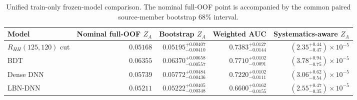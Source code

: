 \begin{table}[tb]
  \centering
  \footnotesize
  \caption{Unified train-only frozen-model comparison. The nominal full-OOF point is accompanied by the common paired source-member bootstrap 68\% interval.}
  \label{tab:baseline-metrics}
  \begin{tabular}{lrrrr}
    \toprule
    Model & Nominal full-OOF $Z_A$ & Bootstrap $Z_A$ & Weighted AUC & Systematics-aware $Z_A$ \\
    \midrule
    $R_{HH}(125,120)$ cut & $0.05168$ & $0.05195^{+0.00407}_{-0.00410}$ & $0.7383^{+0.0127}_{-0.0144}$ & $(2.35^{+0.44}_{-0.47})\times10^{-5}$ \\
    BDT & $0.06355$ & $0.06370^{+0.00658}_{-0.00557}$ & $0.7710^{+0.0102}_{-0.0091}$ & $(3.78^{+0.94}_{-0.75})\times10^{-5}$ \\
    Dense DNN & $0.05739$ & $0.05772^{+0.00484}_{-0.00436}$ & $0.7220^{+0.0102}_{-0.0111}$ & $(3.06^{+0.62}_{-0.54})\times10^{-5}$ \\
    LBN-DNN & $0.05211$ & $0.05222^{+0.00405}_{-0.00348}$ & $0.6600^{+0.0162}_{-0.0155}$ & $(2.55^{+0.47}_{-0.35})\times10^{-5}$ \\
    \bottomrule
  \end{tabular}
\end{table}
